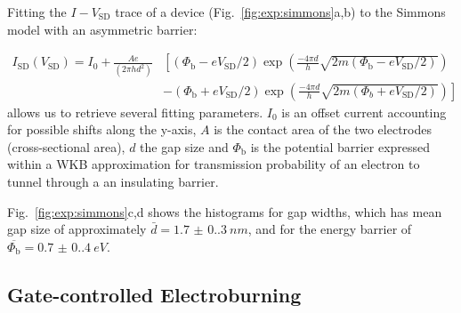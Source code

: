 Fitting the $I-V_\textrm{SD}$ trace of a device (Fig.~\ref{fig:exp:simmons}a,b) to the Simmons model with an asymmetric barrier:

$$
    \begin{aligned}
        I_\textrm{SD}(V_\textrm{SD})= I_0+ \frac{A e}{\left(2 \pi h d^{2}\right)} & {\left[\left(\Phi_\textrm{b}-e V_\textrm{SD}/2\right) \exp \left(\frac{-4 \pi d}{h} \sqrt{2 m\left(\Phi_\textrm{b}-eV_\textrm{SD}/2\right)}\right)\right.} \\
                                                                                  & \left.-\left(\Phi_\textrm{b}+eV_\textrm{SD}/2\right) \exp \left(\frac{-4 \pi d}{h} \sqrt{2 m\left(\Phi_{b}+ eV_\textrm{SD}/2\right)}\right)\right]
    \end{aligned}
$$
%
allows us to retrieve several fitting parameters. $I_0$ is an offset current accounting for possible shifts along the y-axis, $A$ is the contact area of the two electrodes (cross-sectional area), $d$ the gap size and $\Phi_\textrm{b}$ is the potential barrier expressed within a WKB approximation for transmission probability of an electron to tunnel through a an insulating barrier.

Fig.~\ref{fig:exp:simmons}c,d shows the histograms for gap widths, which has mean gap size of approximately $\bar{d} = \SI[separate-uncertainty = true]{1.7(0.3)}{nm}$, and for the energy barrier of $\overline{\Phi_\textrm{b}} = \SI[separate-uncertainty = true]{0.7(0.4)}{eV}$.


\subsection{Gate-controlled Electroburning}

